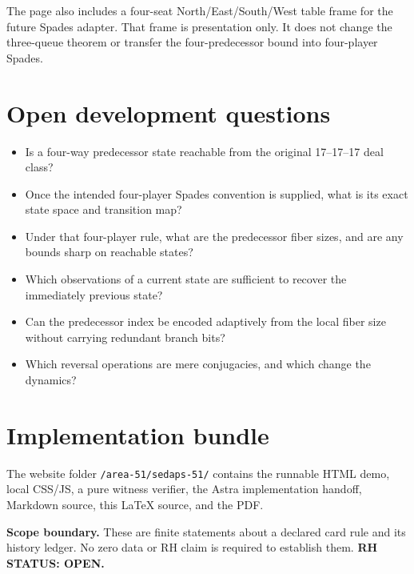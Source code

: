 \documentclass[11pt]{article}
\begin{document}
The page also includes a four-seat North/East/South/West table frame for the future Spades adapter. That frame is presentation only. It does not change the three-queue theorem or transfer the four-predecessor bound into four-player Spades.

\section{Open development questions}
\begin{itemize}
\item Is a four-way predecessor state reachable from the original 17--17--17 deal class?
\item Once the intended four-player Spades convention is supplied, what is its exact state space and transition map?
\item Under that four-player rule, what are the predecessor fiber sizes, and are any bounds sharp on reachable states?
\item Which observations of a current state are sufficient to recover the immediately previous state?
\item Can the predecessor index be encoded adaptively from the local fiber size without carrying redundant branch bits?
\item Which reversal operations are mere conjugacies, and which change the dynamics?
\end{itemize}

\section*{Implementation bundle}
The website folder \texttt{/area-51/sedaps-51/} contains the runnable HTML demo, local CSS/JS, a pure witness verifier, the Astra implementation handoff, Markdown source, this LaTeX source, and the PDF.

\begin{openbox}
\textbf{Scope boundary.} These are finite statements about a declared card rule and its history ledger. No zero data or RH claim is required to establish them. \textbf{RH STATUS: OPEN.}
\end{openbox}
\end{document}

